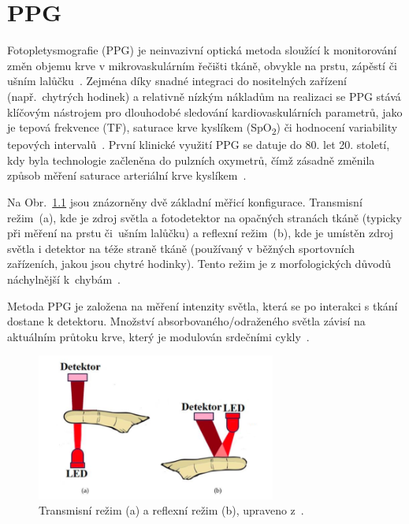\chapter{\acl{PPG}}
\label{chap:PPG_teorie}

Fotopletysmografie (\acs{PPG}) je neinvazivní optická metoda sloužící k monitorování změn objemu krve v mikrovaskulárním řečišti tkáně, obvykle na prstu, zápěstí či ušním lalůčku~\cite{Park2022}.
Zejména díky snadné integraci do nositelných zařízení (např.~chytrých hodinek) a relativně nízkým nákladům na realizaci se \acs{PPG} stává klíčovým nástrojem pro dlouhodobé sledování kardiovaskulárních parametrů,
jako je tepová frekvence (\acs{TF}), saturace krve kyslíkem (SpO\textsubscript{2}) či hodnocení variability tepových intervalů~\cite{Orphanidou2018}.
První klinické využití \acs{PPG} se datuje do 80. let 20. století, kdy byla technologie začleněna do pulzních oxymetrů, čímž zásadně změnila způsob měření saturace arteriální krve kyslíkem~\cite{Charlton2023}.

Na Obr.~\ref{fig:snimaniPPG} jsou znázorněny dvě základní měřicí konfigurace.
Transmisní režim~(a), kde je zdroj světla a fotodetektor na opačných stranách tkáně (typicky při měření na prstu či~ušním lalůčku) a reflexní režim~(b), kde je umístěn zdroj světla i detektor na téže straně tkáně (používaný v běžných sportovních zařízeních, jakou jsou chytré hodinky).
Tento režim je z morfologických důvodů náchylnější k~chybám~\cite{Peralta2017}.

Metoda \acs{PPG} je založena na měření intenzity světla, která se po interakci s tkání dostane k detektoru.
Množství absorbovaného/odraženého světla závisí na aktuálním průtoku krve, který je modulován srdečními cykly~\cite{Park2022}.

\begin{figure}[h]
	\centering
	\includegraphics[width=0.7\textwidth]{./obrazky/snimaniPPG.png}
	\caption[Snímání PPG signálu]{Transmisní režim (a) a reflexní režim (b), upraveno z~\cite{ENIKÖ}.}
	\label{fig:snimaniPPG}
\end{figure}

